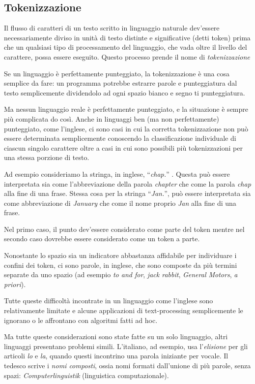 \subsection{Tokenizzazione}

Il flusso di caratteri di un testo scritto in linguaggio naturale dev'essere
necessariamente diviso in unit\`a di testo distinte e significative (detti token)
prima che un qualsiasi tipo di processamento del linguaggio, che vada oltre il
livello del carattere, possa essere eseguito. Questo processo prende il nome di
\emph{tokenizzazione}

Se un linguaggio \`e perfettamente punteggiato, la tokenizzazione \`e una cosa
semplice da fare: un programma potrebbe estrarre parole e punteggiatura dal testo
semplicemente dividendolo ad ogni spazio bianco e segno ti punteggiatura.

Ma nessun linguaggio reale \`e perfettamente punteggiato, e la situazione \`e
sempre pi\`u complicata do cos\`i. Anche in linguaggi ben (ma non perfettamente)
punteggiato, come l'inglese, ci sono casi in cui la corretta tokenizzazione non
pu\`o essere determinata semplicemente conoscendo la classificazione individuale
di ciascun singolo carattere oltre a casi in cui sono possibili pi\`u tokenizzazioni
per una stessa porzione di testo.

Ad esempio consideriamo la stringa, in inglese, ``\emph{chap.}'' . Questa pu\`o
essere interpretata sia come l'abbreviazione della parola \emph{chapter} che come
la parola \emph{chap} alla fine di una frase. Stessa cosa per la stringa ``\emph{Jan.}'',
pu\`o essere interpretata sia come abbreviazione di \emph{January} che come il
nome proprio \emph{Jan} alla fine di una frase.

Nel primo caso, il punto dev'essere considerato come parte del token mentre nel
secondo caso dovrebbe essere considerato come un token a parte.

Nonostante lo spazio sia un indicatore abbastanza affidabile per individuare i
confini dei token, ci sono parole, in inglese, che sono composte da pi\`u termini
separate da uno spazio (ad esempio \emph{to and for}, \emph{jack rabbit},
\emph{General Motors}, \emph{a priori}).

Tutte queste difficolt\`a incontrate in un linguaggio come l'inglese sono
relativamente limitate e alcune applicazioni di text-processing semplicemente le
ignorano o le affrontano con algoritmi fatti ad hoc.

Ma tutte queste considerazioni sono state fatte su un solo linguaggio, altri
linguaggi presentano problemi simili. L'italiano, ad esempio, usa l'\emph{elisione}
per gli articoli \emph{lo} e \emph{la}, quando questi incontrino una parola
iniziante per vocale. Il tedesco scrive i \emph{nomi composti}, ossia nomi formati
dall'unione di pi\`u parole, senza spazi: \emph{Computerlinguistik} (linguistica
computazionale).

